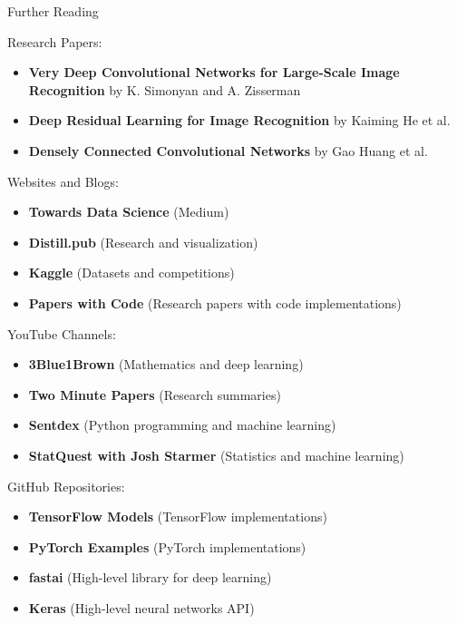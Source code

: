 \begin{frame}{Further Reading}
\begin{block}{Research Papers:}
\begin{itemize}
        \item \textbf{Very Deep Convolutional Networks for Large-Scale Image Recognition} by K. Simonyan and A. Zisserman \vspace{0.5em}
        \item \textbf{Deep Residual Learning for Image Recognition} by Kaiming He et al. \vspace{0.5em}
        \item \textbf{Densely Connected Convolutional Networks} by Gao Huang et al. \vspace{0.5em}
    \end{itemize}
\end{block}
\framebreak
\begin{block}{Websites and Blogs:}
    \begin{itemize}
        \item \textbf{Towards Data Science} (Medium)
        \item \textbf{Distill.pub} (Research and visualization)
        \item \textbf{Kaggle} (Datasets and competitions)
        \item \textbf{Papers with Code} (Research papers with code implementations)
    \end{itemize}
\end{block}
\framebreak
\begin{block}{YouTube Channels:}
    \begin{itemize}
        \item \textbf{3Blue1Brown} (Mathematics and deep learning)
        \item \textbf{Two Minute Papers} (Research summaries)
        \item \textbf{Sentdex} (Python programming and machine learning)
        \item \textbf{StatQuest with Josh Starmer} (Statistics and machine learning)
    \end{itemize}
\end{block}
\framebreak
\begin{block}{GitHub Repositories:}
    \begin{itemize}
        \item \textbf{TensorFlow Models} (TensorFlow implementations)
        \item \textbf{PyTorch Examples} (PyTorch implementations)
        \item \textbf{fastai} (High-level library for deep learning)
        \item \textbf{Keras} (High-level neural networks API)

\end{itemize}
\end{block}
\end{frame}
